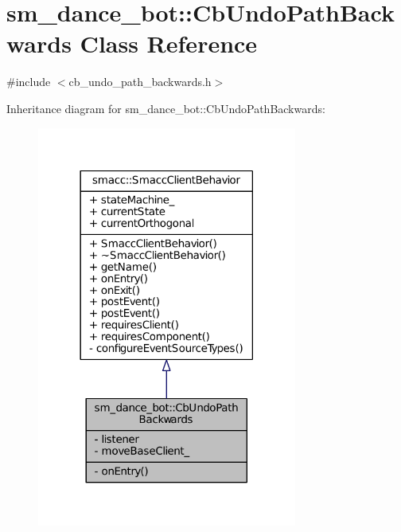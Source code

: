 \hypertarget{classsm__dance__bot_1_1CbUndoPathBackwards}{}\section{sm\+\_\+dance\+\_\+bot\+:\+:Cb\+Undo\+Path\+Backwards Class Reference}
\label{classsm__dance__bot_1_1CbUndoPathBackwards}


{\ttfamily \#include $<$cb\+\_\+undo\+\_\+path\+\_\+backwards.\+h$>$}



Inheritance diagram for sm\+\_\+dance\+\_\+bot\+:\+:Cb\+Undo\+Path\+Backwards\+:
\nopagebreak
\begin{figure}[H]
\begin{center}
\leavevmode
\includegraphics[width=242pt]{classsm__dance__bot_1_1CbUndoPathBackwards__inherit__graph}
\end{center}
\end{figure}


